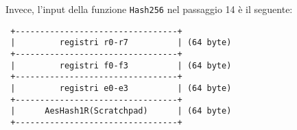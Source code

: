 \noindent
Invece, l'input della funzione \texttt{Hash256} nel passaggio 14 è il seguente:

\begin{verbatim}
 +---------------------------------+
 |         registri r0-r7          | (64 byte)
 +---------------------------------+
 |         registri f0-f3          | (64 byte)
 +---------------------------------+
 |         registri e0-e3          | (64 byte)
 +---------------------------------+
 |      AesHash1R(Scratchpad)      | (64 byte)
 +---------------------------------+
\end{verbatim}


